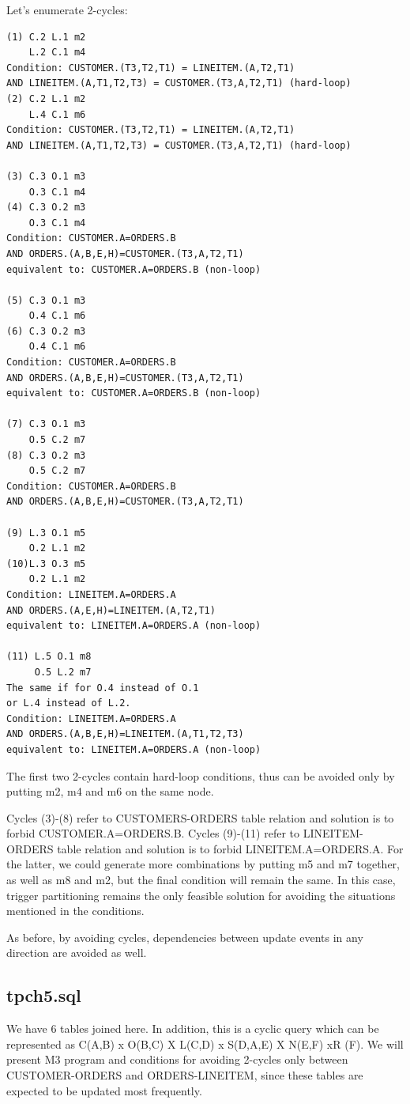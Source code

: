 \documentclass{sig-semester}
\begin{document}
\newpage
Let's enumerate 2-cycles:
\begin{verbatim}
(1) C.2 L.1 m2
    L.2 C.1 m4
Condition: CUSTOMER.(T3,T2,T1) = LINEITEM.(A,T2,T1) 
AND LINEITEM.(A,T1,T2,T3) = CUSTOMER.(T3,A,T2,T1) (hard-loop)
(2) C.2 L.1 m2   
    L.4 C.1 m6
Condition: CUSTOMER.(T3,T2,T1) = LINEITEM.(A,T2,T1)
AND LINEITEM.(A,T1,T2,T3) = CUSTOMER.(T3,A,T2,T1) (hard-loop)

(3) C.3 O.1 m3
    O.3 C.1 m4
(4) C.3 O.2 m3
    O.3 C.1 m4
Condition: CUSTOMER.A=ORDERS.B
AND ORDERS.(A,B,E,H)=CUSTOMER.(T3,A,T2,T1)
equivalent to: CUSTOMER.A=ORDERS.B (non-loop)

(5) C.3 O.1 m3
    O.4 C.1 m6        
(6) C.3 O.2 m3
    O.4 C.1 m6
Condition: CUSTOMER.A=ORDERS.B
AND ORDERS.(A,B,E,H)=CUSTOMER.(T3,A,T2,T1)
equivalent to: CUSTOMER.A=ORDERS.B (non-loop)

(7) C.3 O.1 m3
    O.5 C.2 m7     
(8) C.3 O.2 m3
    O.5 C.2 m7
Condition: CUSTOMER.A=ORDERS.B
AND ORDERS.(A,B,E,H)=CUSTOMER.(T3,A,T2,T1)

(9) L.3 O.1 m5
    O.2 L.1 m2
(10)L.3 O.3 m5
    O.2 L.1 m2
Condition: LINEITEM.A=ORDERS.A
AND ORDERS.(A,E,H)=LINEITEM.(A,T2,T1)
equivalent to: LINEITEM.A=ORDERS.A (non-loop)

(11) L.5 O.1 m8
     O.5 L.2 m7
The same if for O.4 instead of O.1
or L.4 instead of L.2.
Condition: LINEITEM.A=ORDERS.A
AND ORDERS.(A,B,E,H)=LINEITEM.(A,T1,T2,T3)
equivalent to: LINEITEM.A=ORDERS.A (non-loop)
\end{verbatim}

The first two 2-cycles contain hard-loop conditions, thus can be avoided only by putting m2, m4 and m6 on the same node.

Cycles (3)-(8) refer to CUSTOMERS-ORDERS table relation and solution is to forbid CUSTOMER.A=ORDERS.B. Cycles (9)-(11) refer to LINEITEM-ORDERS table relation and solution is to forbid LINEITEM.A=ORDERS.A. For the latter, we could generate more combinations by putting m5 and m7 together, as well as m8 and m2, but the final condition will remain the same. In this case, trigger partitioning remains the only feasible solution for avoiding the situations mentioned in the conditions.

As before, by avoiding cycles, dependencies between update events in any direction are avoided as well.

\subsection{tpch5.sql} We have 6 tables joined here. In addition, this is a cyclic query which can be represented as C(A,B) x O(B,C) X L(C,D) x S(D,A,E) X N(E,F) xR (F). We will present M3 program and conditions for avoiding 2-cycles only between CUSTOMER-ORDERS and ORDERS-LINEITEM, since these tables are expected to be updated most frequently.
\end{document}
